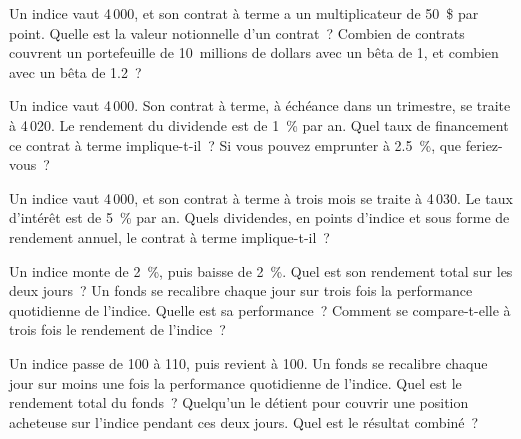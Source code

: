 \begin{question}\label{iq:iv2:etfs-futures-and-index-arbitrage:4}
Un indice vaut 4\,000, et son contrat à terme a un multiplicateur de 50~\$ par point. Quelle est la valeur notionnelle d'un contrat~? Combien de contrats couvrent un portefeuille de 10~millions de dollars avec un bêta de 1, et combien avec un bêta de 1.2~?
\end{question}

\begin{question}\label{iq:iv2:etfs-futures-and-index-arbitrage:5}
Un indice vaut 4\,000. Son contrat à terme, à échéance dans un trimestre, se traite à 4\,020. Le rendement du dividende est de 1~\% par an. Quel taux de financement ce contrat à terme implique-t-il~? Si vous pouvez emprunter à 2.5~\%, que feriez-vous~?
\end{question}

\begin{question}\label{iq:iv2:etfs-futures-and-index-arbitrage:6}
Un indice vaut 4\,000, et son contrat à terme à trois mois se traite à 4\,030. Le taux d'intérêt est de 5~\% par an. Quels dividendes, en points d'indice et sous forme de rendement annuel, le contrat à terme implique-t-il~?
\end{question}

\begin{question}\label{iq:iv2:etfs-futures-and-index-arbitrage:7}
Un indice monte de 2~\%, puis baisse de 2~\%. Quel est son rendement total sur les deux jours~? Un fonds se recalibre chaque jour sur trois fois la performance quotidienne de l'indice. Quelle est sa performance~? Comment se compare-t-elle à trois fois le rendement de l'indice~?
\end{question}

\begin{question}\label{iq:iv2:etfs-futures-and-index-arbitrage:8}
Un indice passe de 100 à 110, puis revient à 100. Un fonds se recalibre chaque jour sur moins une fois la performance quotidienne de l'indice. Quel est le rendement total du fonds~? Quelqu'un le détient pour couvrir une position acheteuse sur l'indice pendant ces deux jours. Quel est le résultat combiné~?
\end{question}


